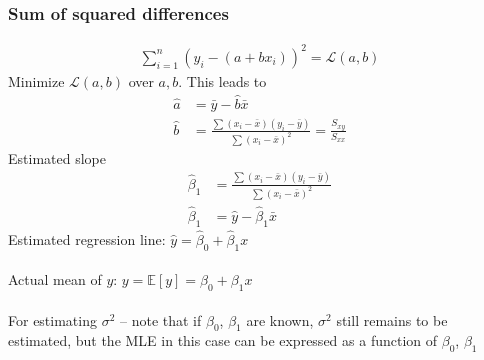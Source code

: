 \subsubsection*{Sum of squared differences}
\begin{gather*}
	\sum_{i=1}^n (y_i - (a + bx_i))^2 = \mathcal{L}(a,b)
\end{gather*}
Minimize $\mathcal{L}(a,b)$ over $a, b$. This leads to
\begin{align*}
	\hat{a} & = \bar{y} - \hat{b} \bar{x}\\
	\hat{b} & = \frac{\sum (x_i - \bar{x}) (y_i - \bar{y})}{\sum (x_i - \bar{x})^2} = \frac{S_{xy}}{S_{xx}}
\end{align*}
Estimated slope
\begin{align*}
	\hat{\beta}_1 & = \frac{\sum (x_i - \bar{x}) (y_i - \bar{y})}{\sum (x_i - \bar{x})^2}\\
	\hat{\beta}_1 & = \hat{y} - \hat{\beta}_1 \bar{x}
\end{align*}
Estimated regression line: $\hat{y} = \hat{\beta}_0 + \hat{\beta}_1 x$\\\\
Actual mean of $y$: $y = \mathbb{E}[y] = \beta_0 + \beta_1 x$\\\\
For estimating $\sigma^2$ -- note that if $\beta_0$, $\beta_1$ are known, $\sigma^2$ still remains to be estimated, but the MLE in this case can be expressed as a function of $\beta_0$, $\beta_1$
